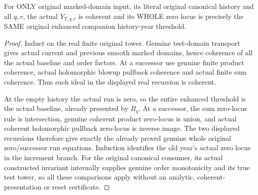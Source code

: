 \begin{theorem}
\label{hir:original-global-companion-history-year-coherent-zero-locus}
\leanok
{}
For ONLY original marked-domain input, its literal original canonical history
and all $q,r$, the actual $Y_{T,q,r}$ is coherent and its WHOLE zero locus is
precisely the SAME original enhanced companion history-year threshold.
\end{theorem}
\begin{proof}
Induct on the real finite original tower. Genuine test-domain transport gives
actual current and previous smooth marked domains, hence coherence of all the
actual baseline and order factors. At a successor use genuine finite product
coherence, actual holomorphic blowup pullback coherence and actual finite sum
coherence. Thus each ideal in the displayed real recursion is coherent.

At the empty history the actual run is zero, so the entire enhanced threshold
is the actual baseline, already presented by $B_q$. At a successor, the sum
zero-locus rule is intersection, genuine coherent product zero-locus is union,
and actual coherent holomorphic pullback zero-locus is inverse image. The two
displayed recursions therefore give exactly the already proved genuine whole
original zero/successor run equations. Induction identifies the old year's
actual zero locus in the increment branch. For the original canonical consumer,
its actual constructed invariant internally supplies genuine order monotonicity
and its true test tower, so all these comparisons apply without an analytic,
coherent-presentation or reset certificate.
\end{proof}

